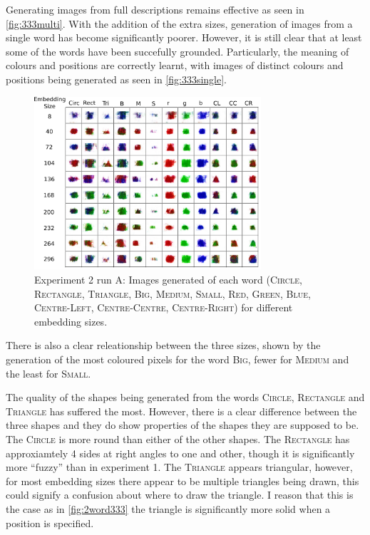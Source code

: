 Generating images from full descriptions remains effective as seen in \autoref{fig:333multi}.
With the addition of the extra sizes, generation of images from a single word has become significantly poorer. However, it is still clear that at least some of the words have been succefully grounded. Particularly, the meaning of colours and positions are correctly learnt, with images of distinct colours and positions being generated as seen in \autoref{fig:333single}. 

\begin{figure}[h]
\centering
\includegraphics[width=0.75\textwidth]{Figs/shapes/singlelabel333A.png}
\caption{Experiment 2 run A: Images generated of each word (\textsc{Circle, Rectangle, Triangle, Big, Medium, Small, Red, Green, Blue, Centre-Left, Centre-Centre, Centre-Right}) for different embedding sizes.}
\label{fig:333single}
\end{figure} 

There is also a clear releationship between the three sizes, shown by the generation of the most coloured pixels for the word \textsc{Big}, fewer for \textsc{Medium} and the least for \textsc{Small}.


The quality of the shapes being generated from the words \textsc{Circle}, \textsc{Rectangle} and \textsc{Triangle} has suffered the most. However, there is a clear difference between the three shapes and they do show properties of the shapes they are supposed to be. The \textsc{Circle} is more round than either of the other shapes. The \textsc{Rectangle} has approxiamtely 4 sides at right angles to one and other, though it is significantly more ``fuzzy'' than in experiment 1. The \textsc{Triangle} appears triangular, however, for most embedding sizes there appear to be multiple triangles being drawn, this could signify a confusion about where to draw the triangle. I reason that this is the case as in \autoref{fig:2word333} the triangle is significantly more solid when a position is specified. 


